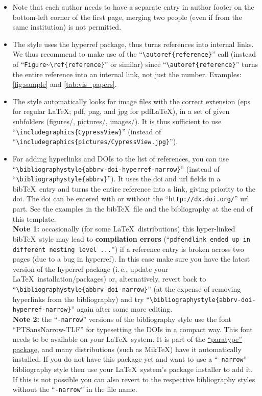 \documentclass[preprint,journal]{vgtc}       %
\begin{document}
\begin{itemize}
\item Note that each author needs to have a separate entry in author footer on the bottom-left corner of the first page, merging two people (even if from the same institution) is not permitted.
\item The style uses the hyperref package, thus turns references into internal links. We thus recommend to make use of the ``\texttt{\textbackslash autoref\{reference\}}'' call (instead of ``\texttt{Figure\~{}\textbackslash ref\{reference\}}'' or similar) since ``\texttt{\textbackslash autoref\{reference\}}'' turns the entire reference into an internal link, not just the number. Examples: \autoref{fig:sample} and \autoref{tab:vis_papers}.
\item The style automatically looks for image files with the correct extension (eps for regular \LaTeX; pdf, png, and jpg for pdf\LaTeX), in a set of given subfolders (figures/, pictures/, images/). It is thus sufficient to use ``\texttt{\textbackslash includegraphics\{CypressView\}}'' (instead of ``\texttt{\textbackslash includegraphics\{pictures/CypressView.jpg\}}'').
\item For adding hyperlinks and DOIs to the list of references, you can use ``\texttt{\textbackslash bibliographystyle\{abbrv-doi-hyperref-narrow\}}'' (instead of ``\texttt{\textbackslash bibliographystyle\{abbrv\}}''). It uses the doi and url fields in a bib\TeX\ entry and turns the entire reference into a link, giving priority to the doi. The doi can be entered with or without the ``\texttt{http://dx.doi.org/}'' url part. See the examples in the bib\TeX\ file and the bibliography at the end of this template.\\[1em]
\textbf{Note 1:} occasionally (for some \LaTeX\ distributions) this hyper-linked bib\TeX\ style may lead to \textbf{compilation errors} (``\texttt{pdfendlink ended up in different nesting level ...}'') if a reference entry is broken across two pages (due to a bug in hyperref). In this case make sure you have the latest version of the hyperref package (i.\,e., update your \LaTeX\ installation/packages) or, alternatively, revert back to ``\texttt{\textbackslash bibliographystyle\{abbrv-doi-narrow\}}'' (at the expense of removing hyperlinks from the bibliography) and try ``\texttt{\textbackslash bibliographystyle\{abbrv-doi-hyperref-narrow\}}'' again after some more editing.\\[1em]
\textbf{Note 2:} the ``\texttt{-narrow}'' versions of the bibliography style use the font ``PTSansNarrow-TLF'' for typesetting the DOIs in a compact way. This font needs to be available on your \LaTeX\ system. It is part of the \href{https://www.ctan.org/pkg/paratype}{``paratype'' package}, and many distributions (such as MikTeX) have it automatically installed. If you do not have this package yet and want to use a ``\texttt{-narrow}'' bibliography style then use your \LaTeX\ system's package installer to add it. If this is not possible you can also revert to the respective bibliography styles without the ``\texttt{-narrow}'' in the file name.\\[1em]

\end{itemize}
\end{document}
